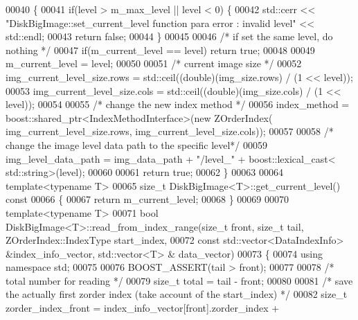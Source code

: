 \begin{DoxyCode}
00040 \{
00041     \textcolor{keywordflow}{if}(level > m\_max\_level || level < 0) \{
00042                 std::cerr << \textcolor{stringliteral}{"DiskBigImage::set\_current\_level function para
       error : invalid level"} << std::endl;
00043         \textcolor{keywordflow}{return} \textcolor{keyword}{false};
00044     \}
00045 
00046         \textcolor{comment}{/* if set the same level, do nothing */}
00047         \textcolor{keywordflow}{if}(m\_current\_level == level)    \textcolor{keywordflow}{return} \textcolor{keyword}{true};
00048 
00049         m\_current\_level = level;
00050 
00051         \textcolor{comment}{/* current image size */}
00052         img\_current\_level\_size.rows = std::ceil((\textcolor{keywordtype}{double})(img\_size.rows) / (1 <<
       level));
00053         img\_current\_level\_size.cols = std::ceil((\textcolor{keywordtype}{double})(img\_size.cols) / (1 <<
       level));
00054 
00055         \textcolor{comment}{/* change the new index method */}
00056         index\_method = boost::shared\_ptr<IndexMethodInterface>(\textcolor{keyword}{new} ZOrderIndex(
      img\_current\_level\_size.rows, img\_current\_level\_size.cols));
00057 
00058         \textcolor{comment}{/* change the image level data path to the specific level*/}
00059         img\_level\_data\_path = img\_data\_path + \textcolor{stringliteral}{"/level\_"} + boost::lexical\_cast<
      std::string>(level);
00060 
00061         \textcolor{keywordflow}{return} \textcolor{keyword}{true};
00062 \}
00063 
00064 \textcolor{keyword}{template}<\textcolor{keyword}{typename} T>
00065 \textcolor{keywordtype}{size\_t} DiskBigImage<T>::get_current_level()\textcolor{keyword}{ const }
00066 \textcolor{keyword}{}\{
00067         \textcolor{keywordflow}{return} m\_current\_level;
00068 \}
00069 
00070 \textcolor{keyword}{template}<\textcolor{keyword}{typename} T>
00071 \textcolor{keywordtype}{bool} DiskBigImage<T>::read_from_index_range(\textcolor{keywordtype}{size\_t} front, \textcolor{keywordtype}{size\_t} tail, 
      ZOrderIndex::IndexType start\_index, 
00072         \textcolor{keyword}{const} std::vector<DataIndexInfo> &index\_info\_vector, std::vector<T> &
      data\_vector)
00073 \{
00074         \textcolor{keyword}{using namespace }std;
00075 
00076         BOOST\_ASSERT(tail > front);
00077 
00078         \textcolor{comment}{/* total number for reading */}
00079         \textcolor{keywordtype}{size\_t} total = tail - front;
00080 
00081         \textcolor{comment}{/* save the actually first zorder index (take account of the
       start\_index) */}
00082         \textcolor{keywordtype}{size\_t} zorder\_index\_front = index\_info\_vector[front].zorder\_index + 

\end{DoxyCode}
